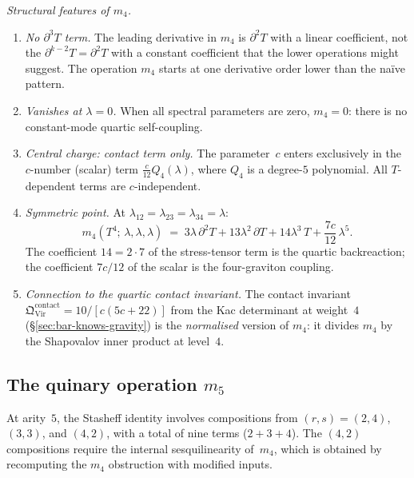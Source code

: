 \documentclass[11pt]{article}
\begin{document}
\noindent\textit{Structural features of $m_4$.}
\begin{enumerate}[label=\textup{(\roman*)},nosep]
\item \textit{No $\partial^3 T$ term.}  The leading derivative
  in $m_4$ is $\partial^2 T$ with a linear coefficient, not
  the $\partial^{k-2}T = \partial^2 T$ with a constant
  coefficient that the lower operations might suggest.
  The operation $m_4$ starts at one derivative order lower
  than the na\"ive pattern.

\item \textit{Vanishes at $\lambda = 0$.}  When all spectral
  parameters are zero, $m_4 = 0$: there is no constant-mode
  quartic self-coupling.

\item \textit{Central charge: contact term only.}  The
  parameter~$c$ enters exclusively in the $c$-number
  (scalar) term $\frac{c}{12}Q_4(\lambda)$, where $Q_4$ is a
  degree-$5$ polynomial.  All $T$-dependent terms are
  $c$-independent.

\item \textit{Symmetric point.}  At
  $\lambda_{12} = \lambda_{23} = \lambda_{34} = \lambda$:
  \begin{equation}\label{eq:m4-symmetric-wn}
  m_4(T^4;\,\lambda,\lambda,\lambda)
  \;=\;
  3\lambda\,\partial^2 T
  + 13\lambda^2\,\partial T
  + 14\lambda^3\, T
  + \frac{7c}{12}\,\lambda^5.
  \end{equation}
  The coefficient $14 = 2 \cdot 7$ of the stress-tensor term
  is the quartic backreaction; the coefficient $7c/12$ of the
  scalar is the four-graviton coupling.

\item \textit{Connection to the quartic contact invariant.}
  The contact invariant
  $\mathfrak{Q}^{\mathrm{contact}}_{\mathrm{Vir}}
  = 10/[c(5c+22)]$
  from the Kac determinant at weight~$4$
  (\S\ref{sec:bar-knows-gravity})
  is the \emph{normalised} version of $m_4$: it divides
  $m_4$ by the Shapovalov inner product at level~$4$.
\end{enumerate}

\subsection{The quinary operation $m_5$}

At arity~$5$, the Stasheff identity involves compositions from
$(r,s) = (2,4)$, $(3,3)$, and $(4,2)$, with a total of nine terms
($2 + 3 + 4$).  The $(4,2)$ compositions require the internal
sesquilinearity of~$m_4$, which is obtained by recomputing the
$m_4$ obstruction with modified inputs.
\end{document}
